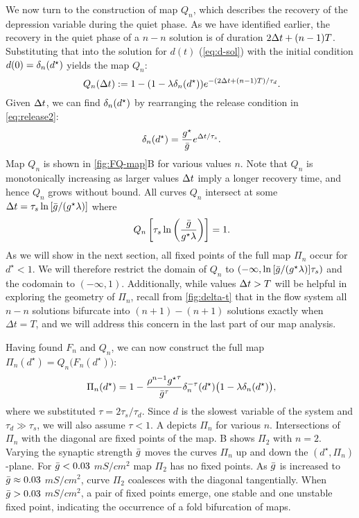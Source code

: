 \documentclass[../manuscript.tex]{subfiles}
\begin{document}
We now turn to the construction of map $Q_{n}$, which describes the recovery of the depression variable during the quiet phase.
As we have identified earlier, the recovery in the quiet phase of a $n-n$ solution is of duration $2\Delta t +(n-1)T$.
Substituting that into the solution for $d(t)$ (\cref{eq:d-sol}) with the initial condition $d(0)=\delta_n(d^\star)$ yields the map $Q_{n}$:
\begin{equation}
  ~\label{eq:Qn-map}
  Q_{n}(\Delta t):=1- (1- \lambda \delta_n(d^\star))e^{-(2\Delta t+(n-1)T)/\tau_{d}}.
\end{equation}
Given $\Delta t$, we can find $\delta_n(d^\star)$ by rearranging the release condition in \cref{eq:release2}:
\begin{equation}
  ~\label{eq:dn}
  \delta_n(d^\star) = \frac{g^{\star}}{\bar g} e^{\Delta t/\tau_{s}}.
\end{equation}
Map $Q_{n}$ is shown in \cref{fig:FQ-map}B for various values $n$.
Note that $Q_{n}$ is monotonically increasing as larger values $\Delta t$ imply a longer recovery time, and hence $Q_{n}$ grows without bound.
All curves $Q_{n}$ intersect at some $\Delta t = \tau_{s}\ln{\left[\bar g/(g^{\star}\lambda)\right]}$ where
\begin{equation}
  ~\label{eq:Qn-intersect}
  Q_{n}\left[\tau_{s}\ln{\left(\frac{\bar g}{g^{\star}\lambda}\right)}\right]=1.
\end{equation}
As we will show in the next section, all fixed points of the full map $\Pi_{n}$ occur for $d^{\star}<1$.
We will therefore restrict the domain of $Q_{n}$ to $(-\infty, \ln{\left[\bar g/(g^{\star}\lambda)\right]}\tau_{s})$ and the codomain to $(-\infty, 1)$.
Additionally, while values $\Delta t>T$ will be helpful in exploring the geometry of $\Pi_{n}$, recall from \cref{fig:delta-t} that in the flow system all $n-n$ solutions bifurcate into $(n+1)-(n+1)$ solutions exactly when $\Delta t=T$, and we will address this concern in the last part of our map analysis.

Having found $F_{n}$ and $Q_{n}$, we can now construct the full map $\Pi_{n}(d^{\star})=Q_{n}\big(F_{n}(d^{\star})\big)$:
\begin{equation}
  ~\label{eq:Pn-map}
  \Pi_{n}(d^{\star})= 1-
  \frac{\rho^{n-1}{g^{\star}}^{\tau}}{{\bar g}^{\tau}}\delta_{n}^{-\tau}(d^{\star})\big(1-\lambda\delta_{n}(d^{\star})\big),
\end{equation}
where we substituted $\tau = 2\tau_{s}/\tau_{d}$.
Since $d$ is the slowest variable of the system and $\tau_{d}\gg \tau_{s}$, we will also assume $\tau<1$.
A depicts $\Pi_{n}$ for various $n$.
Intersections of $\Pi_{n}$ with the diagonal are fixed points of the map.
B shows $\Pi_{2}$ with $n=2$.
Varying the synaptic strength $\bar g$ moves the curves $\Pi_{n}$ up and down the $(d^{\star}, \Pi_{n})$-plane.
For $\bar g<0.03$ $\si{mS/cm^{2}}$ map $\Pi_{2}$ has no fixed points.
As $\bar g$ is increased to $\bar g \approx 0.03$ $\si{mS/cm^{2}}$, curve $\Pi_{2}$ coalesces with the diagonal tangentially.
When $\bar g > 0.03$ $\si{mS/cm^{2}}$, a pair of fixed points emerge, one stable and one unstable fixed point, indicating the occurrence of a fold bifurcation of maps.
\end{document}
